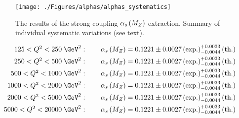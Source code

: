 \begin{figure}[th!]
\centering
\texttt{[image: ./Figures/alphas/alphas\_systematics]}
\caption{The results of the strong coupling $\mbox{$\alpha_{s}\left(M_{Z}\right)$}$ extraction. Summary of individual systematic variations (see text).}
\label{fig:alphas_systematics}
\end{figure}


\begin{align}
	125 < \qsq < 250\;\GeV^2:\qquad \asz &= 0.1221 \pm 0.0027 \left( \text{exp.} \right) ^{+0.0033}_{-0.0044} \left( \text{th.} \right) \notag \\
	250 < \qsq < 500\;\GeV^2:\qquad \asz &= 0.1221 \pm 0.0027 \left( \text{exp.} \right) ^{+0.0033}_{-0.0044} \left( \text{th.} \right) \notag \\
	500 < \qsq < 1000\;\GeV^2:\qquad \asz &= 0.1221 \pm 0.0027 \left( \text{exp.} \right) ^{+0.0033}_{-0.0044} \left( \text{th.} \right) \notag \\
	1000 < \qsq < 2000\;\GeV^2:\qquad \asz &= 0.1221 \pm 0.0027 \left( \text{exp.} \right) ^{+0.0033}_{-0.0044} \left( \text{th.} \right) \notag \\
	2000 < \qsq < 5000\;\GeV^2:\qquad \asz &= 0.1221 \pm 0.0027 \left( \text{exp.} \right) ^{+0.0033}_{-0.0044} \left( \text{th.} \right) \notag \\
	5000 < \qsq < 20000\;\GeV^2:\qquad \asz &= 0.1221 \pm 0.0027 \left( \text{exp.} \right) ^{+0.0033}_{-0.0044} \left( \text{th.} \right) 	
\end{align}
